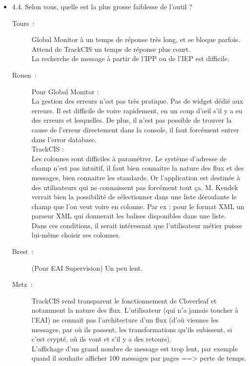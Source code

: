 \begin{itemize}
	  \item 4.4. Selon vous, quelle est la plus grosse faiblesse de l’outil ?
	  \begin{description}
	  	\item[Tours~:] Global Monitor à un temps de réponse très long, et se bloque
	  	parfois.\\
	  	Attend de TrackCIS un temps de réponse plus court.\\
	  	La recherche de message à partir de l’IPP ou de l’IEP est difficile.
	  	\item[Rouen~:] Pour Global Monitor :\\
		La gestion des erreurs n’est pas très pratique. Pas de widget dédié aux
		erreurs. Il est difficile de voire rapidement, en un coup d’œil s’il y a eu des
		erreurs et lesquelles. De plus, il n’est pas possible de trouver la cause de
		l’erreur directement dans la console, il faut forcément entrer dans l’error
		database.\\
		TrackCIS :\\
		Les colonnes sont difficiles à paramétrer. Le système d’adresse de champ n’est
		pas intuitif, il faut bien connaitre la nature des flux et des messages, bien
		connaitre les standards. Or l’application est destinée à des utilisateurs qui
		ne connaissent pas forcément tout ça. M. Kendek verrait bien la possibilité de
		sélectionner dans une liste déroulante le champ que l’on veut voire en colonne.
		Par ex : pour le format XML un parseur XML qui donnerait les balises
		disponibles dans une liste.\\
		Dans ces conditions, il serait intéressant que l’utilisateur métier puisse
		lui-même choisir ses colonnes.
	  	\item[Brest~:] (Pour EAI Supervision) Un peu lent.
	  	\item[Metz~:] TrackCIS rend transparent le fonctionnement de Cloverleaf et
	  	notamment la nature des flux. L’utilisateur (qui n’a jamais toucher à
	  	l’EAI) ne connait pas l’architecture d’un flux (d’où viennes les messages,
	  	par où ils passent, les transformations qu’ils subissent, si c’est crypté,
	  	où ils vont et s’il y a des retours).\\
		L’affichage d’un grand nombre de message est trop lent, par exemple quand il
		souhaite afficher 100 messages par pages ==> perte de temps.
	  \end{description}
	  

\end{itemize}
